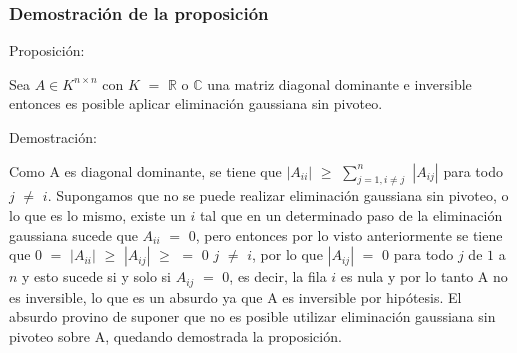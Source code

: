 \subsubsection{Demostración de la proposición}
Proposición:

Sea $A \in K^{n \times n}$ con $K$ $=$ $\mathbb{R}$ o $\mathbb{C}$ una matriz diagonal dominante e inversible entonces es posible aplicar eliminación gaussiana sin pivoteo.

Demostración:

Como A es diagonal dominante, se tiene que $|A_{ii}|$ $\geq$ $\sum_{j=1, i \neq j}^{n}$ $|A_{ij}|$ para todo $j$ $\neq$ $i$. Supongamos que no se puede realizar eliminación gaussiana sin pivoteo, o lo que es lo mismo, existe un $i$ tal que en un determinado paso de la eliminación gaussiana sucede que $A_{ii}$ $=$ $0$, pero entonces por lo visto anteriormente se tiene que $0$ $=$ $|A_{ii}|$ $\geq$ $|A_{ij}|$  $\geq$ $=$ $0$  $j$ $\neq$ $i$, por lo que $|A_{ij}|$ $=$ $0$ para todo $j$ de $1$ a $n$ y esto sucede si y solo si $A_{ij}$ $=$ $0$, es decir, la fila $i$ es nula y por lo tanto A no es inversible, lo que es un absurdo ya que A es inversible por hipótesis. El absurdo provino de suponer que no es posible utilizar eliminación gaussiana sin pivoteo sobre A, quedando demostrada la proposición.

